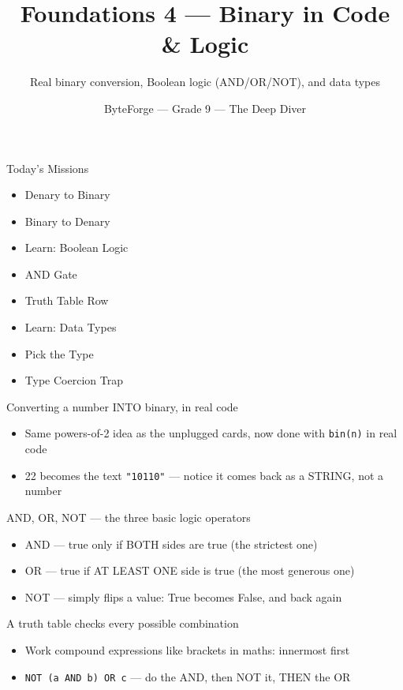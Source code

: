 \documentclass[aspectratio=169]{beamer}
\title{Foundations 4 — Binary in Code \& Logic}
\subtitle{Real binary conversion, Boolean logic (AND/OR/NOT), and data types}
\author{ByteForge --- Grade 9 --- The Deep Diver}
\date{}
\begin{document}
\begin{frame}
    \titlepage
\end{frame}

\begin{frame}{Today's Missions}
    \Large
    \begin{itemize}
        \item Denary to Binary
        \item Binary to Denary
        \item Learn: Boolean Logic
        \item AND Gate
        \item Truth Table Row
        \item Learn: Data Types
        \item Pick the Type
        \item Type Coercion Trap
    \end{itemize}
\end{frame}

\begin{frame}{Converting a number INTO binary, in real code}
    \large
    \begin{itemize}
        \item Same powers-of-2 idea as the unplugged cards, now done with \texttt{bin(n)} in real code
        \item 22 becomes the text \texttt{"10110"} --- notice it comes back as a STRING, not a number
    \end{itemize}
\end{frame}


\begin{frame}{AND, OR, NOT --- the three basic logic operators}
    \large
    \begin{itemize}
        \item AND --- true only if BOTH sides are true (the strictest one)
        \item OR --- true if AT LEAST ONE side is true (the most generous one)
        \item NOT --- simply flips a value: True becomes False, and back again
    \end{itemize}
\end{frame}


\begin{frame}{A truth table checks every possible combination}
    \large
    \begin{itemize}
        \item Work compound expressions like brackets in maths: innermost first
        \item \texttt{NOT (a AND b) OR c} --- do the AND, then NOT it, THEN the OR
    \end{itemize}
\end{frame}
\end{document}
